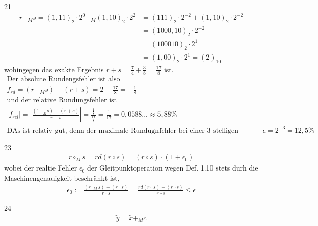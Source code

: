 \documentclass[13pt]{scrreprt}
\newenvironment{ebox}[1]{#1\\}{}
\begin{document}
\begin{ebox}{21}
	\begin{align*}
	r + _{M} s = (1,11)_2 \cdot 2^0 +_{M} (1,10)_2 \cdot 2^2 &= (111)_2 \cdot 2^{-2} + (1,10)_2 \cdot 2^{-2}\\
	&= (1000,10)_2 \cdot 2^{-2}\\
	&= (100010)_2 \cdot 2^1\\
	&= (1,00)_2 \cdot 2^1 = (2)_{10}
	\end{align*}
	wohingegen das exakte Ergebnis $ r+s = \frac74 + \frac38= \frac{17}{8}$ ist.\\
	\begin{align*}
	\text{Der absolute Rundengsfehler ist also}\\
	f_{rd} = (r+_M s) - (r + s) = 2 -\frac{17}{8} = -\frac{1}{8}\\
	\text{und der relative Rundungsfehler ist}\\
	|f_{rel}| = |\frac{(1 +_M s)-(r+s)}{r+s}| = \frac{\frac18}{\frac{17}{8}} = \frac{1}{17} = 0,0588... \approx 5,88\%\\
	\text{DAs ist relativ gut, denn der maximale Rundugnfehler bei einer 3-stelligen Mantisse ist} \quad \epsilon =   2^{-3} = 12,5\%
	\end{align*}
\end{ebox}


\begin{ebox}{23}
	\begin{align*}
	r \circ_M s = rd(r \circ s) = (r\circ s)\cdot(1 + \epsilon_0)
	\end{align*}
	wobei der realtie Fehler $\epsilon_0$ der Gleitpunktoperation wegen Def. 1.10 stets durh die Maschinengenauigkeit beschränkt ist,
	\begin{align*}
	\epsilon_0 := \frac{(r\circ_M s)-(r \circ s)}{r \circ s} = \frac{rd(r \circ s) - (r \circ s)}{r \circ s} \leqslant \epsilon
	\end{align*}
\end{ebox}

\begin{ebox}{24}
	\begin{align*}
		\tilde{y} = \tilde{x} +_M c \\
		
	\end{align*}
\end{ebox}
\end{document}
